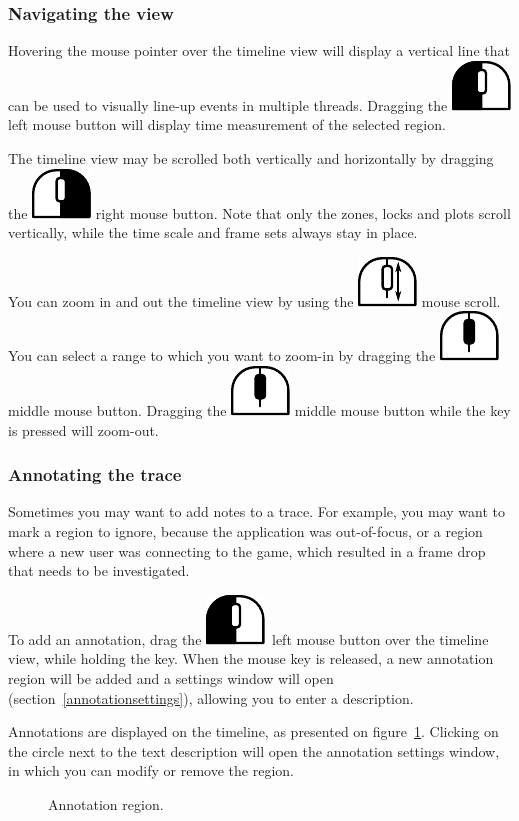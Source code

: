 \documentclass[hidelinks,titlepage,a4paper]{article}
\newcommand{\LMB}{\includegraphics[height=.8\baselineskip]{icons/lmb}}
\newcommand{\RMB}{\includegraphics[height=.8\baselineskip]{icons/rmb}}
\newcommand{\MMB}{\includegraphics[height=.8\baselineskip]{icons/mmb}}
\newcommand{\Scroll}{\includegraphics[height=.8\baselineskip]{icons/scroll}}
\begin{document}
\subsubsection{Navigating the view}

Hovering the \faMousePointer{} mouse pointer over the timeline view will display a vertical line that can be used to visually line-up events in multiple threads. Dragging the \LMB{} left mouse button will display time measurement of the selected region.

The timeline view may be scrolled both vertically and horizontally by dragging the \RMB{} right mouse button. Note that only the zones, locks and plots scroll vertically, while the time scale and frame sets always stay in place.

You can zoom in and out the timeline view by using the \Scroll{} mouse scroll. You can select a range to which you want to zoom-in by dragging the \MMB{} middle mouse button. Dragging the \MMB{} middle mouse button while the \keys{\ctrl} key is pressed will zoom-out.

\subsubsection{Annotating the trace}
\label{annotatingtrace}

Sometimes you may want to add notes to a trace. For example, you may want to mark a region to ignore, because the application was out-of-focus, or a region where a new user was connecting to the game, which resulted in a frame drop that needs to be investigated.

To add an annotation, drag the \LMB{}~left mouse button over the timeline view, while holding the \keys{\ctrl} key. When the mouse key is released, a new annotation region will be added and a settings window will open (section~\ref{annotationsettings}), allowing you to enter a description.

Annotations are displayed on the timeline, as presented on figure~\ref{annotation}. Clicking on the circle next to the text description will open the annotation settings window, in which you can modify or remove the region.

\begin{figure}[h]
\centering{}
\caption{Annotation region.}
\label{annotation}
\end{figure}
\end{document}
